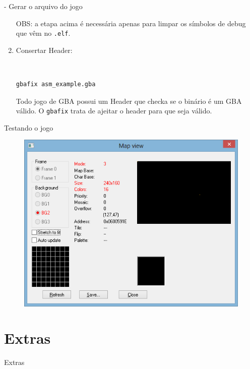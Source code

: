 \documentclass{beamer}
\begin{document}
\begin{darkframes}
\begin{frame}[fragile]{\subsecname - Gerar o arquivo do jogo}
\begin{enumerate}
{            OBS: a etapa acima é necessária apenas para limpar os símbolos
            de debug que vêm no \texttt{.elf}.
        }

        \vspace{1em}
        \item Consertar Header:
        {\
            \tiny
            \begin{verbatim}
gbafix asm_example.gba
            \end{verbatim}

            Todo jogo de GBA possui um Header que checka se o binário é um GBA
            válido. O \texttt{gbafix} trata de ajeitar o header para que seja
            válido.
        }
    \end{enumerate}
\end{frame}

\begin{frame}{Testando o jogo}
    \begin{figure}[H]
        \centering
        \includegraphics[width=1\textwidth,height=0.5\textheight,keepaspectratio]{mapview_asm_example}
    \end{figure}
\end{frame}


\section{Extras}

\begin{frame}{}
    \begin{center}
        \huge Extras
    \end{center}
\end{frame}


\end{darkframes}
\end{document}
